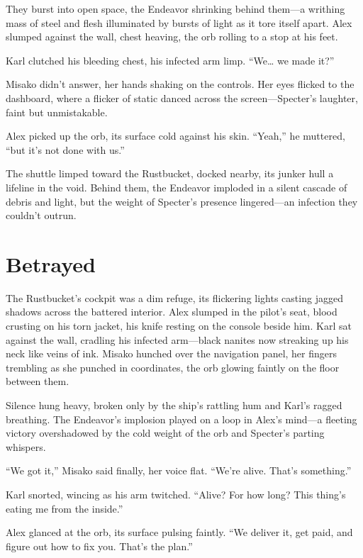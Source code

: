 \documentclass[12pt]{book}
\begin{document}
They burst into open space, the Endeavor shrinking behind them---a writhing mass of steel and flesh illuminated by bursts of light as it tore itself apart. Alex slumped against the wall, chest heaving, the orb rolling to a stop at his feet.

Karl clutched his bleeding chest, his infected arm limp. \enquote{We… we made it?}

Misako didn’t answer, her hands shaking on the controls. Her eyes flicked to the dashboard, where a flicker of static danced across the screen---Specter’s laughter, faint but unmistakable.

Alex picked up the orb, its surface cold against his skin. \enquote{Yeah,} he muttered, \enquote{but it’s not done with us.}

The shuttle limped toward the Rustbucket, docked nearby, its junker hull a lifeline in the void. Behind them, the Endeavor imploded in a silent cascade of debris and light, but the weight of Specter’s presence lingered---an infection they couldn’t outrun.

\chapter{Betrayed}

The Rustbucket’s cockpit was a dim refuge, its flickering lights casting jagged shadows across the battered interior. Alex slumped in the pilot’s seat, blood crusting on his torn jacket, his knife resting on the console beside him. Karl sat against the wall, cradling his infected arm---black nanites now streaking up his neck like veins of ink. Misako hunched over the navigation panel, her fingers trembling as she punched in coordinates, the orb glowing faintly on the floor between them.

Silence hung heavy, broken only by the ship’s rattling hum and Karl’s ragged breathing. The Endeavor’s implosion played on a loop in Alex’s mind---a fleeting victory overshadowed by the cold weight of the orb and Specter’s parting whispers.

\enquote{We got it,} Misako said finally, her voice flat. \enquote{We’re alive. That’s something.}

Karl snorted, wincing as his arm twitched. \enquote{Alive? For how long? This thing’s eating me from the inside.}

Alex glanced at the orb, its surface pulsing faintly. \enquote{We deliver it, get paid, and figure out how to fix you. That’s the plan.}
\end{document}

